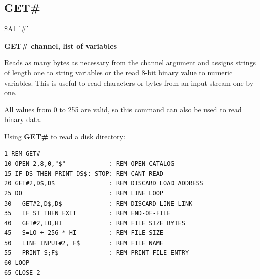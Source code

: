 \subsection{GET\#}
\begin{description}[leftmargin=2cm,style=nextline]
\item [Token:] \$A1 '\#'
\item [Format:] {\bf GET\# channel, list of variables}
\item [Usage:] Reads as many bytes
               as necessary from the channel argument
               and assigns strings of length one to
               string variables or the read 8-bit binary value
               to numeric variables.
               This is useful to read characters or bytes from
               an input stream one by one.

\item [Remarks:] All values from 0 to 255 are valid, so this
               command can also be used to read binary data.

\item [Example:] Using {\bf GET\#} to read a disk directory:
\begin{tcolorbox}[colback=black,coltext=white]
\verbatimfont{\codefont}
\begin{verbatim}
1 REM GET#
10 OPEN 2,8,0,"$"            : REM OPEN CATALOG
15 IF DS THEN PRINT DS$: STOP: REM CANT READ
20 GET#2,D$,D$               : REM DISCARD LOAD ADDRESS
25 DO                        : REM LINE LOOP
30   GET#2,D$,D$             : REM DISCARD LINE LINK
35   IF ST THEN EXIT         : REM END-OF-FILE
40   GET#2,LO,HI             : REM FILE SIZE BYTES
45   S=LO + 256 * HI         : REM FILE SIZE
50   LINE INPUT#2, F$        : REM FILE NAME
55   PRINT S;F$              : REM PRINT FILE ENTRY
60 LOOP
65 CLOSE 2
\end{verbatim}
\end{tcolorbox}
\end{description}


\newpage
